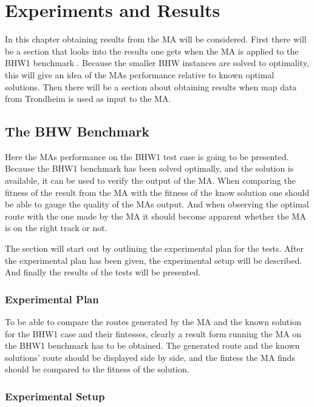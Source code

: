 \chapter{Experiments and Results}
\label{cha:experiments_and_results}

In this chapter obtaining results from the MA will be considered. First there will be a section that looks into the results one gets when the MA is applied to the BHW1 benchmark \citep{BHWdocumentationSINTEF}. Because the smaller BHW instances are solved to optimality, this will give an idea of the MAs performance relative to known optimal solutions. Then there will be a section about obtaining results when map data from Trondheim is used as input to the MA.

\section{The BHW Benchmark}

Here the MAs performance on the BHW1 test case is going to be presented. Because the BHW1 benchmark has been solved optimally, and the solution is available, it can be used to verify the output of the MA. When comparing the fitness of the result from the MA with the fitness of the know solution one should be able to gauge the quality of the MAs output. And when observing the optimal route with the one made by the MA it should become apparent whether the MA is on the right track or not.

The section will start out by outlining the experimental plan for the tests. After the experimental plan has been given, the experimental setup will be described. And finally the results of the tests will be presented.

\subsection{Experimental Plan}

To be able to compare the routes generated by the MA and the known solution for the BHW1 case and their fintesses, clearly a result form running the MA on the BHW1 benchmark has to be obtained. The generated route and the known solutions' route should be displayed side by side, and the fintess the MA finds should be compared to the fitness of the solution.

\subsection{Experimental Setup}

